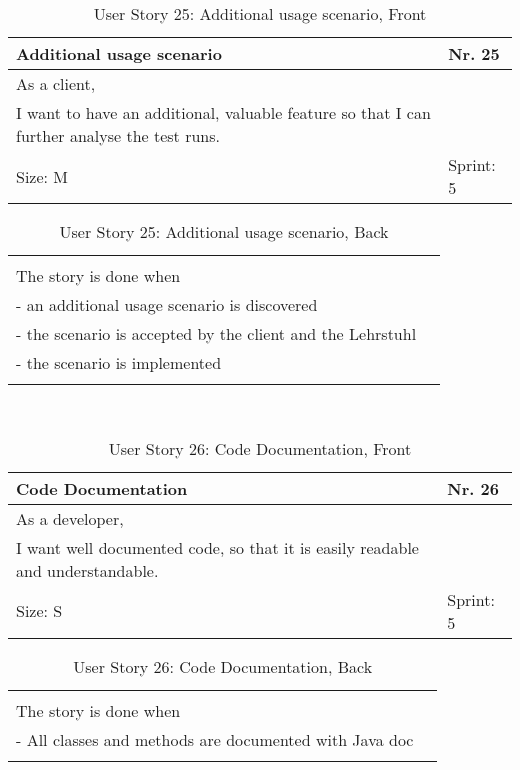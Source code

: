 \begin{table}[H]
  \caption{User Story 25: Additional usage scenario, Front}
  \label{Story_25_Front}
  \centering
  \begin{tabular}{|p{9cm} p{2cm}|}
	\hline  	
  	Additional usage scenario & Nr. 25 \\ 
  	\hline
  	As a client, &    \\ 
  	I want to have an additional, valuable feature so that I can further analyse the test runs.  &    \\ 
  	Size: M & Sprint: 5 \\ 
  	\hline
  \end{tabular}
\end{table}
\begin{table}[H]
  \caption{User Story 25: Additional usage scenario, Back}
  \label{Story_25_Back}
  \centering
  \begin{tabular}{|p{10cm} p{1cm}|}
  \hline
  	  &    \\ 
  	The story is done when &    \\ 
  	 - an additional usage scenario is discovered & \\ 
  	 - the scenario is accepted by the client and the Lehrstuhl & \\ 
  	 - the scenario is implemented & \\ 
  	 
  	  &  
  	   \\ 
  	\hline
  \end{tabular}
\end{table}  

\ \\ 

\begin{table}[H]
  \caption{User Story 26: Code Documentation, Front}
  \label{Story_26_Front}
  \centering
  \begin{tabular}{|p{9cm} p{2cm}|}
	\hline  	
  	Code Documentation & Nr. 26 \\ 
  	\hline
  	As a developer, &    \\ 
  	I want well documented code, so that it is easily readable and understandable. &    \\ 
  	Size: S & Sprint: 5 \\ 
  	\hline
  \end{tabular}
\end{table}
\begin{table}[H]
  \caption{User Story 26: Code Documentation, Back}
  \label{Story_26_Back}
  \centering
  \begin{tabular}{|p{10cm} p{1cm}|}
  \hline
  	  &    \\ 
  	The story is done when &    \\ 
  	 - All classes and methods are documented with Java doc & \\ 
  	 
  	  &  
  	   \\ 
  	\hline
  \end{tabular}
\end{table} 

